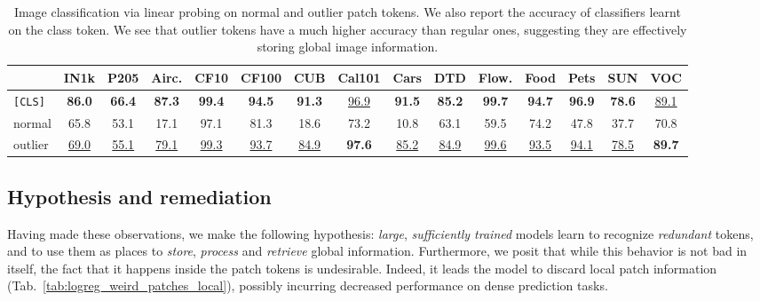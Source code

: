 \begin{table}[t]
  \centering
  \begin{tabular}{@{} l *{14}{c@{\hspace{4pt}}} @{}}
    \toprule
    & IN1k & P205 & Airc. & CF10 & CF100 & CUB & Cal101 & Cars & DTD & Flow. & Food & Pets & SUN & VOC \\
    \midrule
    \texttt{[CLS]} & \textbf{86.0} & \textbf{66.4} & \textbf{87.3} & \textbf{99.4} & \textbf{94.5} & \textbf{91.3} & \underline{96.9} & \textbf{91.5} & \textbf{85.2} & \textbf{99.7} & \textbf{94.7} & \textbf{96.9} & \textbf{78.6} & \underline{89.1} \\
    normal & 65.8 & 53.1 & 17.1 & 97.1 & 81.3 & 18.6 & 73.2 & 10.8 & 63.1 & 59.5 & 74.2 & 47.8 & 37.7 & 70.8 \\
    outlier & \underline{69.0} & \underline{55.1} & \underline{79.1} & \underline{99.3} & \underline{93.7} & \underline{84.9} & \textbf{97.6} & \underline{85.2} & \underline{84.9} & \underline{99.6} & \underline{93.5} & \underline{94.1} & \underline{78.5} & \textbf{89.7} \\
    \bottomrule
  \end{tabular}
  \caption{
    Image classification via linear probing on normal and outlier patch tokens. 
    We also report the accuracy of classifiers learnt on the class token.
    We see that outlier tokens have a much higher accuracy than regular ones, suggesting they are effectively storing global image information.
  }
  \vspace{-1em}
  \label{tab:logreg_weird_patches_image_classif}
\end{table}



\subsection{Hypothesis and remediation}
\label{sec:hypothesis}
Having made these observations, we make the following hypothesis: \emph{large}, \emph{sufficiently trained} models learn to recognize \emph{redundant} tokens, and to use them as places to \emph{store}, \emph{process} and \emph{retrieve} global information.
Furthermore, we posit that while this behavior is not bad in itself, the fact that it happens inside the patch tokens is undesirable.
Indeed, it leads the model to discard local patch information (Tab.~\ref{tab:logreg_weird_patches_local}), possibly incurring decreased performance on dense prediction tasks. %

